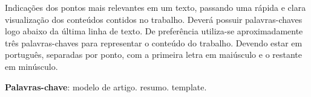 
\setlength{\absparsep}{18pt} %
\begin{resumo}

Indicações dos pontos mais relevantes em um texto, passando uma rápida e clara visualização dos conteúdos contidos no trabalho. Deverá possuir palavras-chaves logo abaixo da última linha de texto. De preferência utiliza-se aproximadamente três palavras-chaves para representar o conteúdo do trabalho. Devendo estar em português, separadas por ponto, com a primeira letra em maiúsculo e o restante em minúsculo.

 \textbf{Palavras-chave}: modelo de artigo. resumo. template.   
\end{resumo}

